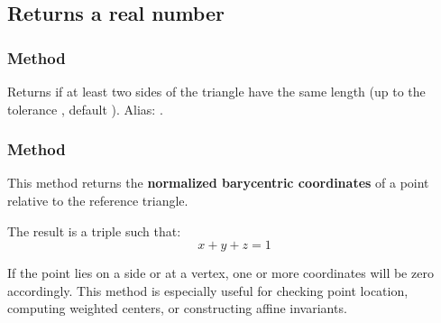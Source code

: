 
\subsection{Returns a real number}

\subsubsection{Method }
\label{ssub:method_triangle_check_isosceles}

Returns  if at least two sides of the triangle have the same length
(up to the tolerance , default ).
Alias: .

\begin{tkzexample}
\end{tkzexample}

\subsubsection{Method }
\label{ssub:_triangle_barycentric__coordinates_pt}

This method returns the \textbf{normalized barycentric coordinates} of a point relative to the reference triangle.

\begin{mybox}
\end{mybox}

\medskip

The result is a triple  such that:
\[
x + y + z = 1
\]

\medskip

If the point lies on a side or at a vertex, one or more coordinates will be zero accordingly. This method is especially useful for checking point location, computing weighted centers, or constructing affine invariants.

